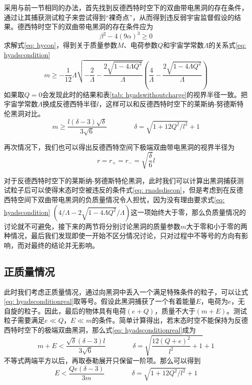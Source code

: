采用与前一节相同的办法，首先找到反德西特时空下的双曲带电黑洞的存在条件，通过让其捕获测试粒子来尝试得到“裸奇点”，从而得到违反弱宇宙监督假设的结果。德西特时空下的双曲带电黑洞的存在条件应为
\begin{equation}\label{eq: hycon}
    \beta^2-4 \left(9\alpha\right)^3 \geq 0
\end{equation}
求解式\eqref{eq: hycon}，得到关于质量参数$M$、电荷参数$Q$和宇宙学常数$\Lambda$的关系式\eqref{eq: hyadscondition}
\begin{equation}\label{eq: hyadscondition}
    m \geq -\frac{1}{12} \Lambda  \sqrt{-\frac{2}{\Lambda }-\frac{2 \sqrt{1-4 \Lambda  Q^2}}{\Lambda }} \left(\frac{4}{\Lambda }-\frac{2 \sqrt{1-4 \Lambda 
    Q^2}}{\Lambda }\right)
\end{equation}
如果取$Q=0$会发现此时的结果和表\ref{tab: hyadswithoutcharge}的视界半径一致。把宇宙学常数$\Lambda$换成反德西特半径$l$，这样可以和反德西特时空下的莱斯纳-努德斯特伦黑洞对比。
\begin{equation}\label{eq: hyadsconditionreal}
    m\geq \frac{l\left(\delta-3\right)\sqrt{\delta}}{3\sqrt{6}} \qquad \qquad \delta=\sqrt{1+12Q^2/l^2}+1
\end{equation}

再次情况下，我们也可以得出反德西特空间下极端双曲带电黑洞的视界半径为
\begin{equation}\label{eq: hyadsextramhorizon}
    r=r_+=r_-=\sqrt{\frac{\delta}{6}}l
\end{equation}

对于反德西特时空下的莱斯纳-努德斯特伦黑洞，此时我们可以计算出黑洞捕获测试粒子后可以使得末态时空被违反的条件式\eqref{eq: rnadsdiscon}，但是考虑到在反德西特空间下双曲带电黑洞的负质量情况令人担忧，因为没有理由要求式\eqref{eq: hyadscondition} $\left(4/\Lambda -2 \sqrt{1-4 \Lambda Q^2}/\Lambda \right)$这一项始终大于零，那么负质量情况的讨论就不可避免，接下来的两节将分别讨论黑洞的质量参数$m$大于零和小于零的两种情况，最后我们发现即使一开始不区分情况讨论，只对过程中不等号的方向有影响，而对最终的结论并无影响。
\subsection{正质量情况}
此时我们考虑正质量情况，通过向黑洞中丢入一个满足特殊条件的粒子，可以让式\eqref{eq: hyadsconditionreal}取等号。假设此黑洞捕获了一个有着能量$E$，电荷为$e$，无自旋的粒子。因此，最后的物体具有电荷$\left(e+Q\right)$，质量不大于$\left(m+E\right)$。测试粒子需要满足$e\ll Q$，$E\ll m$的条件。简单计算得出，若末态时空不能保持为反德西特时空下的极端双曲黑洞，那么式\eqref{eq: hyadsconditionreal}成为
\begin{equation}\label{eq: hyadsputtestparticle}
    m+E < \frac{\sqrt{\delta } (\delta -3) l}{3 \sqrt{6}} \quad\quad\quad\quad  \delta= \sqrt{\frac{12 \left(Q+e\right)^2}{l^2}+1}+1
\end{equation}
不等式两端平方以后，再取泰勒展开只保留一阶项。那么可以得到
\begin{equation}\label{eq: hyadsdiscon}
    E < \frac{Q e \left(\delta-3\right)}{3 m} \qquad \qquad \delta=\sqrt{1+12Q^2/l^2}+1
\end{equation}

